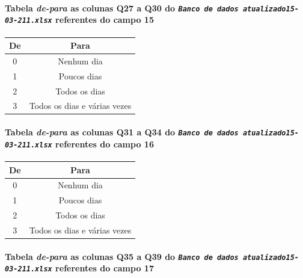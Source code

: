 \documentclass[]{article}
\let\oldparagraph\paragraph
\renewcommand{\paragraph}[1]{\oldparagraph{#1}\mbox{}}
\begin{document}
\hypertarget{tabela-de-para-as-colunas-q27-a-q30-do-banco-de-dados-atualizado15-03-211.xlsx-referentes-do-campo-15}{%
\paragraph{\texorpdfstring{Tabela \emph{de-para} as colunas Q27 a Q30 do \emph{\texttt{Banco\ de\ dados\ atualizado15-03-211.xlsx}} referentes do campo 15}{Tabela de-para as colunas Q27 a Q30 do Banco de dados atualizado15-03-211.xlsx referentes do campo 15}}\label{tabela-de-para-as-colunas-q27-a-q30-do-banco-de-dados-atualizado15-03-211.xlsx-referentes-do-campo-15}}

\begin{longtable}[]{@{}cc@{}}
\toprule
De & Para\tabularnewline
\midrule
\endhead
0 & Nenhum dia\tabularnewline
1 & Poucos dias\tabularnewline
2 & Todos os dias\tabularnewline
3 & Todos os dias e várias vezes\tabularnewline
\bottomrule
\end{longtable}

\hypertarget{tabela-de-para-as-colunas-q31-a-q34-do-banco-de-dados-atualizado15-03-211.xlsx-referentes-do-campo-16}{%
\paragraph{\texorpdfstring{Tabela \emph{de-para} as colunas Q31 a Q34 do \emph{\texttt{Banco\ de\ dados\ atualizado15-03-211.xlsx}} referentes do campo 16}{Tabela de-para as colunas Q31 a Q34 do Banco de dados atualizado15-03-211.xlsx referentes do campo 16}}\label{tabela-de-para-as-colunas-q31-a-q34-do-banco-de-dados-atualizado15-03-211.xlsx-referentes-do-campo-16}}

\begin{longtable}[]{@{}cc@{}}
\toprule
De & Para\tabularnewline
\midrule
\endhead
0 & Nenhum dia\tabularnewline
1 & Poucos dias\tabularnewline
2 & Todos os dias\tabularnewline
3 & Todos os dias e várias vezes\tabularnewline
\bottomrule
\end{longtable}

\hypertarget{tabela-de-para-as-colunas-q35-a-q39-do-banco-de-dados-atualizado15-03-211.xlsx-referentes-do-campo-17}{%
\paragraph{\texorpdfstring{Tabela \emph{de-para} as colunas Q35 a Q39 do \emph{\texttt{Banco\ de\ dados\ atualizado15-03-211.xlsx}} referentes do campo 17}{Tabela de-para as colunas Q35 a Q39 do Banco de dados atualizado15-03-211.xlsx referentes do campo 17}}\label{tabela-de-para-as-colunas-q35-a-q39-do-banco-de-dados-atualizado15-03-211.xlsx-referentes-do-campo-17}}
\end{document}
